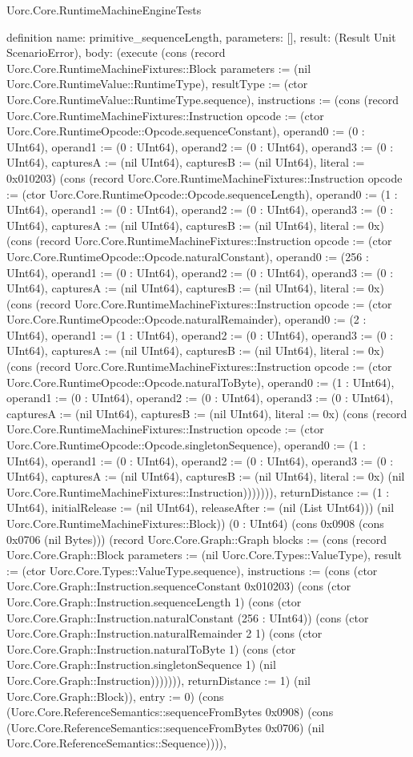 \begin{lexlean}{Uorc.Core.RuntimeMachineEngineTests}
\begin{semanticmodule}
definition{
  name: primitive_sequenceLength,
  parameters: [],
  result: (Result Unit ScenarioError),
  body: (execute (cons (record Uorc.Core.RuntimeMachineFixtures::Block {parameters := (nil Uorc.Core.RuntimeValue::RuntimeType), resultType := (ctor Uorc.Core.RuntimeValue::RuntimeType.sequence), instructions := (cons (record Uorc.Core.RuntimeMachineFixtures::Instruction {opcode := (ctor Uorc.Core.RuntimeOpcode::Opcode.sequenceConstant), operand0 := (0 : UInt64), operand1 := (0 : UInt64), operand2 := (0 : UInt64), operand3 := (0 : UInt64), capturesA := (nil UInt64), capturesB := (nil UInt64), literal := 0x010203}) (cons (record Uorc.Core.RuntimeMachineFixtures::Instruction {opcode := (ctor Uorc.Core.RuntimeOpcode::Opcode.sequenceLength), operand0 := (1 : UInt64), operand1 := (0 : UInt64), operand2 := (0 : UInt64), operand3 := (0 : UInt64), capturesA := (nil UInt64), capturesB := (nil UInt64), literal := 0x}) (cons (record Uorc.Core.RuntimeMachineFixtures::Instruction {opcode := (ctor Uorc.Core.RuntimeOpcode::Opcode.naturalConstant), operand0 := (256 : UInt64), operand1 := (0 : UInt64), operand2 := (0 : UInt64), operand3 := (0 : UInt64), capturesA := (nil UInt64), capturesB := (nil UInt64), literal := 0x}) (cons (record Uorc.Core.RuntimeMachineFixtures::Instruction {opcode := (ctor Uorc.Core.RuntimeOpcode::Opcode.naturalRemainder), operand0 := (2 : UInt64), operand1 := (1 : UInt64), operand2 := (0 : UInt64), operand3 := (0 : UInt64), capturesA := (nil UInt64), capturesB := (nil UInt64), literal := 0x}) (cons (record Uorc.Core.RuntimeMachineFixtures::Instruction {opcode := (ctor Uorc.Core.RuntimeOpcode::Opcode.naturalToByte), operand0 := (1 : UInt64), operand1 := (0 : UInt64), operand2 := (0 : UInt64), operand3 := (0 : UInt64), capturesA := (nil UInt64), capturesB := (nil UInt64), literal := 0x}) (cons (record Uorc.Core.RuntimeMachineFixtures::Instruction {opcode := (ctor Uorc.Core.RuntimeOpcode::Opcode.singletonSequence), operand0 := (1 : UInt64), operand1 := (0 : UInt64), operand2 := (0 : UInt64), operand3 := (0 : UInt64), capturesA := (nil UInt64), capturesB := (nil UInt64), literal := 0x}) (nil Uorc.Core.RuntimeMachineFixtures::Instruction))))))), returnDistance := (1 : UInt64), initialRelease := (nil UInt64), releaseAfter := (nil (List UInt64))}) (nil Uorc.Core.RuntimeMachineFixtures::Block)) (0 : UInt64) (cons 0x0908 (cons 0x0706 (nil Bytes))) (record Uorc.Core.Graph::Graph {blocks := (cons (record Uorc.Core.Graph::Block {parameters := (nil Uorc.Core.Types::ValueType), result := (ctor Uorc.Core.Types::ValueType.sequence), instructions := (cons (ctor Uorc.Core.Graph::Instruction.sequenceConstant 0x010203) (cons (ctor Uorc.Core.Graph::Instruction.sequenceLength 1) (cons (ctor Uorc.Core.Graph::Instruction.naturalConstant (256 : UInt64)) (cons (ctor Uorc.Core.Graph::Instruction.naturalRemainder 2 1) (cons (ctor Uorc.Core.Graph::Instruction.naturalToByte 1) (cons (ctor Uorc.Core.Graph::Instruction.singletonSequence 1) (nil Uorc.Core.Graph::Instruction))))))), returnDistance := 1}) (nil Uorc.Core.Graph::Block)), entry := 0}) (cons (Uorc.Core.ReferenceSemantics::sequenceFromBytes 0x0908) (cons (Uorc.Core.ReferenceSemantics::sequenceFromBytes 0x0706) (nil Uorc.Core.ReferenceSemantics::Sequence)))),
}
\end{semanticmodule}
\end{lexlean}
